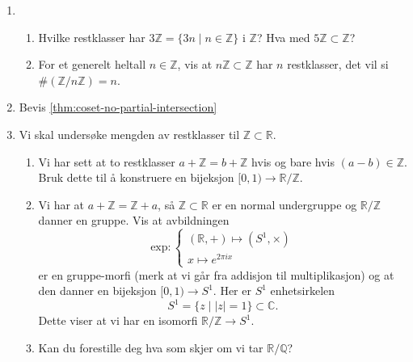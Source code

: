 \begin{enumerate}
    \item
        \begin{enumerate}
            \item Hvilke restklasser har $3\mathbb Z = \{3n \mid n\in \mathbb Z\}$
                i $\mathbb Z$? Hva med $5\mathbb Z\subset \mathbb Z$?
            \item For et generelt heltall $n\in \mathbb Z$,
                vis at $n\mathbb Z\subset \mathbb Z$ har $n$ restklasser,
                det vil si $\#(\mathbb Z / n\mathbb Z) = n$.
        \end{enumerate}
    \item Bevis \cref{thm:coset-no-partial-intersection}
    \item Vi skal undersøke mengden av restklasser til $\mathbb Z\subset \mathbb R$.
        \begin{enumerate}
            \item Vi har sett at to restklasser $a + \mathbb Z = b + \mathbb Z$
                hvis og bare hvis $(a - b)\in \mathbb Z$.
                Bruk dette til å konstruere en bijeksjon
                $[0,1)\to \mathbb R / \mathbb Z$.
            \item Vi har at $a + \mathbb Z = \mathbb Z + a$,
                så $\mathbb Z\subset \mathbb R$ er en normal undergruppe
                og $\mathbb R / \mathbb Z$ danner en gruppe.
                Vis at avbildningen
                \[
                    \mathrm{exp}\colon \begin{cases}
                        (\mathbb R, +)\mapsto (S^1,\times)\\
                        x\mapsto e^{2\pi i x}
                    \end{cases}
                \]
                er en gruppe-morfi (merk at vi går fra addisjon til multiplikasjon)
                og at den danner en bijeksjon $[0,1)\to S^1$.
                Her er $S^1$ enhetsirkelen
                \[
                    S^1 = \{z\mid |z| = 1\}\subset \mathbb C.
                \]
                Dette viser at vi har en isomorfi $\mathbb R / \mathbb Z \to S^1$.
            \item Kan du forestille deg hva som skjer om vi tar
                $\mathbb R / \mathbb Q$?
        \end{enumerate}
\end{enumerate}

